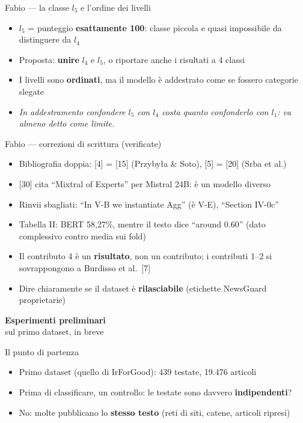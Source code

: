 \documentclass[aspectratio=169]{beamer}
\newcommand{\hl}[1]{\textbf{#1}}
\newcommand{\divider}[2]{%
  \begin{frame}[plain]
    \vfill
    \begin{center}
      {\color{dividerblue}\Huge\textbf{#1}}\\[0.8em]
      {\large #2}
    \end{center}
    \vfill
  \end{frame}}
\begin{document}
\begin{frame}{Fabio --- la classe $l_5$ e l'ordine dei livelli}
  \vfill
  \begin{itemize}[<+->]
    \setlength\itemsep{0.8em}
    \item $l_5$ = punteggio \hl{esattamente 100}: classe piccola e quasi impossibile da distinguere da $l_4$
    \item Proposta: \hl{unire} $l_4$ e $l_5$, o riportare anche i risultati a 4 classi
    \item I livelli sono \hl{ordinati}, ma il modello \`e addestrato come se fossero categorie slegate
    \item[] {\small\itshape In addestramento confondere $l_5$ con $l_4$ costa quanto confonderlo con $l_1$: va almeno detto come limite.}
  \end{itemize}
  \vfill
\end{frame}

\begin{frame}{Fabio --- correzioni di scrittura (verificate)}
  \vfill
  \small
  \begin{itemize}[<+->]
    \setlength\itemsep{0.55em}
    \item Bibliografia doppia: [4] = [15] (Przyby\l{}a \& Soto), [5] = [20] (Srba et al.)
    \item {[30]} cita ``Mixtral of Experts'' per Mistral 24B: \`e un modello diverso
    \item Rinvii sbagliati: ``In V-B we instantiate Agg'' (\`e V-E), ``Section IV-0c''
    \item Tabella II: BERT 58,27\%, mentre il testo dice ``around 0.60'' (dato complessivo contro media sui fold)
    \item Il contributo 4 \`e un \hl{risultato}, non un contributo; i contributi 1--2 si sovrappongono a Burdisso et al.\ [7]
    \item Dire chiaramente se il dataset \`e \hl{rilasciabile} (etichette NewsGuard proprietarie)
  \end{itemize}
  \vfill
\end{frame}

\divider{Esperimenti preliminari}{sul primo dataset, in breve}

\begin{frame}{Il punto di partenza}
  \vfill
  \begin{itemize}[<+->]
    \setlength\itemsep{0.9em}
    \item Primo dataset (quello di IrForGood): 439 testate, 19.476 articoli
    \item Prima di classificare, un controllo: le testate sono davvero \hl{indipendenti}?
    \item No: molte pubblicano lo \hl{stesso testo} (reti di siti, catene, articoli ripresi)
  \end{itemize}
  \vfill
\end{frame}
\end{document}
